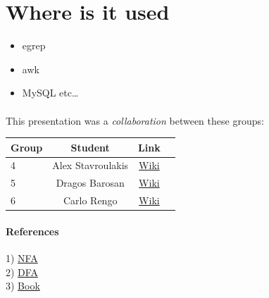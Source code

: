 \documentclass[a4paper,11pt]{report}
\begin{document}
\section{Where is it used}
\begin{itemize}
  \item egrep
  \item awk
  \item MySQL etc\ldots
\end{itemize}

\paragraph{}
This presentation was a \emph{collaboration} between these groups: \\

\begin{center}
 \begin{tabular}{| l | c | c | c |}
 \hline \textbf{Group} & \textbf{Student} & \textbf{Link} \\
 \hline 
 4 & Alex Stavroulakis & \href{https://www.os3.nl/2014-2015/students/alexandros_stavroulakis/es}{Wiki}\\
 \hline 
 5 & Dragos Barosan & \href{https://www.os3.nl/2014-2015/students/dragos_barosan/es/week2#homework_3}{Wiki} \\ 
 \hline 
 6 & Carlo Rengo & \href{https://www.os3.nl/2014-2015/students/carlo_rengo/es/homewrk_3}{Wiki} \\ 
 \hline 
 \end{tabular} 
\end{center}


\paragraph{References\\}
1) \href{http://en.wikipedia.org/wiki/Nondeterministic_finite_automaton}{NFA} \\
2) \href{http://en.wikipedia.org/wiki/Deterministic_finite_automaton}{DFA} \\
3) \href{http://dl.e-book-free.com/2013/07/mastering_regular_expressions_third_edition.pdf}{Book} \\
\end{document}

